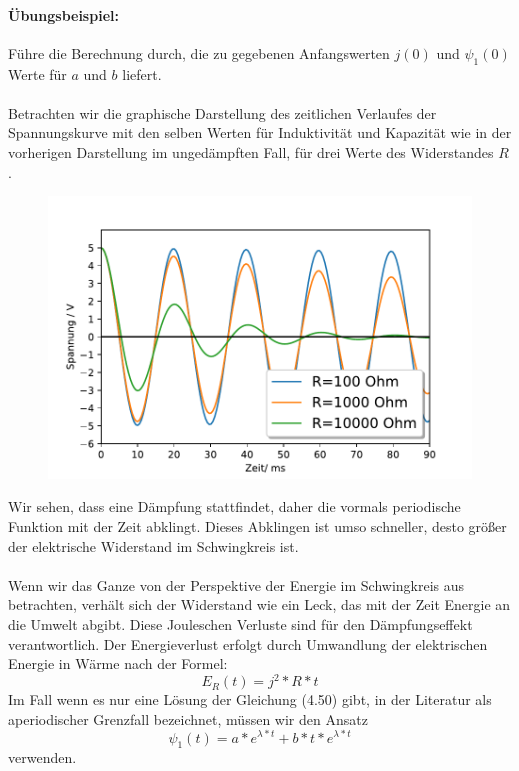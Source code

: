 \documentclass[11pt,a4paper,leqno]{report}
\numberwithin{equation}{chapter}
\begin{document}
\paragraph{\"Ubungsbeispiel:} F\"uhre die Berechnung durch, die zu gegebenen Anfangswerten $j(0)$ und $\psi_1(0)$ Werte f\"ur $a$ und $b$ liefert.\\
\\
Betrachten wir die graphische Darstellung des zeitlichen Verlaufes der Spannungskurve mit den selben Werten f\"ur Induktivit\"at und Kapazit\"at wie in der vorherigen Darstellung im unged\"ampften Fall, f\"ur drei Werte des Widerstandes $R$.
\begin{figure}[H]
	\begin{center}
		\includegraphics[scale=0.75]{Bilder/dampf.pdf}
	\end{center}
\end{figure}
\noindent
Wir sehen, dass eine D\"ampfung stattfindet, daher die vormals periodische Funktion mit der Zeit abklingt. Dieses Abklingen ist umso schneller, desto gr\"o\ss{}er der elektrische Widerstand im Schwingkreis ist.\\
\\
Wenn wir das Ganze von der Perspektive der Energie im Schwingkreis aus betrachten, verh\"alt sich der Widerstand wie ein Leck, das mit der Zeit Energie an die Umwelt abgibt. Diese Jouleschen Verluste sind f\"ur den D\"ampfungseffekt verantwortlich. Der Energieverlust erfolgt durch Umwandlung der elektrischen Energie in W\"arme nach der Formel:
\begin{equation}
	E_R(t) = j^2*R*t
\end{equation}
Im Fall wenn es nur eine L\"osung der Gleichung (4.50) gibt, in der Literatur als aperiodischer Grenzfall bezeichnet,  m\"ussen wir den Ansatz 
\begin{equation}
	\psi_1(t) = a*e^{\lambda*t} + b*t*e^{\lambda*t}
\end{equation}verwenden. 
\end{document}
